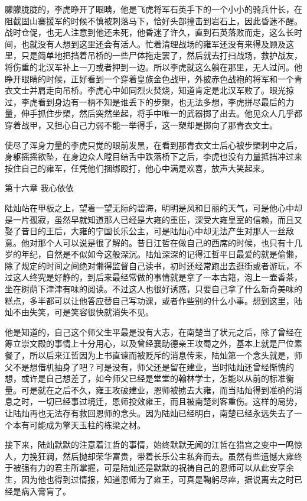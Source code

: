 朦朦胧胧的，李虎睁开了眼睛，他是飞虎将军石英手下的一个小小的骑兵什长，在阻截固山寨援军的时候不慎被刺落马下，恰好头部撞击到岩石上，因此昏迷不醒。战时仓促，也无人注意到他还未死，他昏迷了许久，直到石英落败而走，这么长时间，也就没有人想到这里还会有活人。忙着清理战场的雍军还没有来得及顾及这里，只是简单地把挡着吊桥的一些尸体拖走罢了，然后就去打扫战场，救护战友，将伤重的北汉军补上一刀或者押到一边。所以李虎就这么躺在那里，无人过问。他睁开眼睛的时候，正好看到一个穿着皇族金色战甲，外披赤色战袍的将军和一个青衣文士并肩走向吊桥。李虎心中如同烈火焚烧，知道肯定是北汉军败了。眼光掠过，李虎看到身边有一柄不知是谁丢下的步槊，也无法多想，李虎拼尽最后的力量，伸手抓住步槊，然后突然坐起，将手中唯一的武器掷了出去。他见众人几乎都穿着战甲，又担心自己力弱不能一举得手，这一槊却是掷向了那青衣文士。

使尽了浑身力量的李虎只觉的眼前发黑，在看到那青衣文士后心被步槊刺中之后，身躯摇摇欲坠，在身边众人瞠目结舌中跌落桥下之后，李虎也没有力量抵挡冲过来按住自己的雍军，任凭他们捆绑殴打，他心中满是欢喜，放声大笑起来。

第十六章    我心依依

陆灿站在甲板之上，望着一望无际的碧海，明明是风和日丽的天气，可是他心中却是一片孤寂，虽然早就知道那人已经是大雍的重臣，深受大雍皇室的信赖，而且又娶了昔日的王后，大雍的宁国长乐公主，可是陆灿心中却无法产生对那人一丝敌意。他对那个人可以说是很了解的。昔日江哲在做自己的西席的时候，也只有十几岁的年纪，自然是不似如今这般深沉。陆灿深深的记得江哲平日最爱的就是偷懒，除了规定的时间之间绝对懒得监督自己读书，初时还经常跑出去逛街或者游玩，不过这人终究是好静的，到后来最经常做的事情就是拿了一本古籍，泡上一壶香茶，坐在树荫下津津有味的阅读。不过这人也很好诱惑，只要自己拿了什么新奇美味的糕点，多半都可以让他答应替自己写功课，或者作些别的什么小事。想到这里，陆灿不由失笑，可是笑容很快就消失不见。

他是知道的，自己这个师父生平最是没有大志，在南楚当了状元之后，除了曾经在筹立崇文殿的事情上十分用心，以及曾经襄助德亲王攻蜀之外，基本上就是尸位素餐了，所以后来江哲因为上书直谏而被贬斥的消息传来，陆灿第一个念头就是，师父不是想借机抽身了吧？可是没有，师父还是留在建业，当时陆灿还曾经惭愧的想，或许是自己想差了，如今师父已经是堂堂的翰林学士，怎能以从前的标准衡量。可是就在之后不久，雍王攻破建业，恩师被掳去大雍，而当陆灿得到准确的消息之时，一切已经事过境迁，恩师投效雍王，而且被南楚刺客重伤。这样的局势，让陆灿再也无法存有救回恩师的念头。因为陆灿已经明白，南楚已经永远失去了一个本有可能成为擎天玉柱的栋梁之材。

接下来，陆灿默默的注意着江哲的事情，始终默默无闻的江哲在猎宫之变中一鸣惊人，力挽狂澜，然后抛却荣华富贵，带着长乐公主私奔而去。虽然有些遗憾大雍终于被强有力的君主所掌握，可是陆灿还是默默的祝祷自己的恩师可以从此安享余生，因为他也得到过情报，知道恩师为了雍王，可真是鞠躬尽瘁，据说离去之时已经是病入膏肓了。

